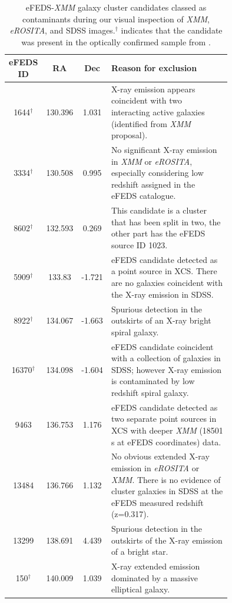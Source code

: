 \documentclass[fleqn,usenatbib]{mnras}
\begin{document}
\begin{table}
\begin{center}
\caption[]{{eFEDS-{\em XMM} galaxy cluster candidates classed as contaminants during our visual inspection of {\em XMM}, {\em eROSITA}, and SDSS images.\newline $^\dagger$ indicates that the candidate was present in the optically confirmed sample from \cite{efedsclusteropticalcat}.}\label{tab:rejects}}
\vspace{1mm}
\begin{tabular}{ccc|p{0.75\linewidth}}
\hline
\hline
eFEDS ID & RA & Dec & Reason for exclusion\\
\hline
\hline
1644$^\dagger$ & 130.396 & 1.031 & X-ray emission appears coincident with two interacting active galaxies (identified from {\em XMM} proposal). \\ 
\hline
3334$^\dagger$ & 130.508 & 0.995 & No significant X-ray emission in {\em XMM} or {\em eROSITA}, especially considering low redshift assigned in the eFEDS catalogue. \\ 
\hline
8602$^\dagger$ & 132.593 & 0.269 & This candidate is a cluster that has been split in two, the other part has the eFEDS source ID 1023. \\ 
\hline
5909$^\dagger$ & 133.83 & -1.721 & eFEDS candidate detected as a point source in XCS. There are no galaxies coincident with the X-ray emission in SDSS. \\ 
\hline
8922$^\dagger$ & 134.067 & -1.663 & Spurious detection in the outskirts of an X-ray bright spiral galaxy. \\ 
\hline
16370$^\dagger$ & 134.098 & -1.604 & eFEDS candidate coincident with a collection of galaxies in SDSS; however X-ray emission is contaminated by low redshift spiral galaxy. \\ 
\hline
9463 & 136.753 & 1.176 & eFEDS candidate detected as two separate point sources in XCS with deeper {\em XMM} (18501 s at eFEDS coordinates) data. \\ 
\hline
13484 & 136.766 & 1.132 & No obvious extended X-ray emission in {\em eROSITA} or {\em XMM}.  There is no evidence of cluster galaxies in SDSS at the eFEDS measured redshift (z=0.317). \\ 
\hline
13299 & 138.691 & 4.439 & Spurious detection in the outskirts of the X-ray emission of a bright star. \\ 
\hline
150$^\dagger$ & 140.009 & 1.039 & X-ray extended emission dominated by a massive elliptical galaxy. \\ 

\end{tabular}
\end{center}
\end{table}
\end{document}
